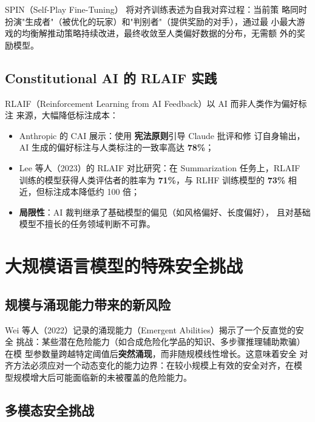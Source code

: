 \documentclass[12pt,a4paper,UTF8]{ctexart}
\begin{document}
SPIN（Self-Play Fine-Tuning）\cite{} 将对齐训练表述为自我对弈过程：当前策
略同时扮演"生成者"（被优化的玩家）和"判别者"（提供奖励的对手），通过最
小最大游戏的均衡解推动策略持续改进，最终收敛至人类偏好数据的分布，无需额
外的奖励模型。

\subsection{Constitutional AI 的 RLAIF 实践}

RLAIF（Reinforcement Learning from AI Feedback）以 AI 而非人类作为偏好标注
来源，大幅降低标注成本：
\begin{itemize}[leftmargin=2em]
  \item Anthropic 的 CAI 展示：使用 \textbf{宪法原则}引导 Claude 批评和修
    订自身输出，AI 生成的偏好标注与人类标注的一致率高达 \textbf{78\%}；
  \item Lee 等人（2023）的 RLAIF 对比研究：在 Summarization 任务上，RLAIF
    训练的模型获得人类评估者的胜率为 \textbf{71\%}，与 RLHF 训练模型的
    \textbf{73\%} 相近，但标注成本降低约 100 倍；
  \item \textbf{局限性}：AI 裁判继承了基础模型的偏见（如风格偏好、长度偏好），
    且对基础模型不擅长的任务领域判断不可靠。
\end{itemize}

\section{大规模语言模型的特殊安全挑战}
\label{sec:scale}

\subsection{规模与涌现能力带来的新风险}

Wei 等人（2022）记录的涌现能力（Emergent Abilities）揭示了一个反直觉的安全
挑战：某些潜在危险能力（如合成危险化学品的知识、多步骤推理辅助欺骗）在模
型参数量跨越特定阈值后\textbf{突然涌现}，而非随规模线性增长。这意味着安全
对齐方法必须应对一个动态变化的能力边界：在较小规模上有效的安全对齐，在模
型规模增大后可能面临新的未被覆盖的危险能力。

\subsection{多模态安全挑战}
\end{document}
